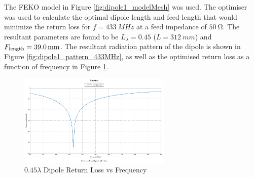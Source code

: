 The FEKO model in Figure \ref{fig:dipole1_modelMesh} was used. The optimiser was used to calculate the optimal dipole length and feed length that would minimize the return loss for $f = \SI{433}{MHz}$ at a feed impedance of $\SI{50}{\ohm}$. The resultant parameters are found to be $L_\lambda = 0.45$ ($L = \SI{312}{mm}$) and $F_{\textnormal{length}} = \SI{39.0}{mm}$. The resultant radiation pattern of the dipole is shown in Figure \ref{fig:dipole1_pattern_433MHz}, as well as the optimised return loss as a function of frequency in Figure \ref{fig:dipole1_returnLoss}.

\begin{figure}[!htb]
  \centering
  \includegraphics[width=0.65\textwidth]{dipole1_returnLoss}
  \caption{$0.45 \lambda$ Dipole Return Loss vs Frequency}
  \label{fig:dipole1_returnLoss}
\end{figure}